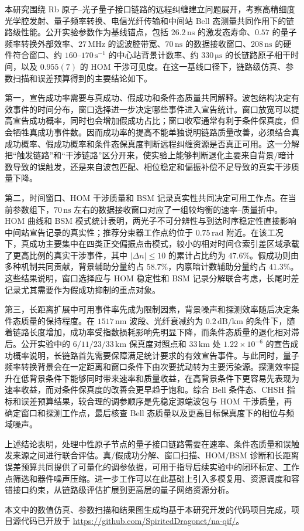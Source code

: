 
\begin{conclusions}

本研究围绕 Rb 原子--光子量子接口链路的远程纠缠建立问题展开，考察高精细度光学腔发射、量子频率转换、电信光纤传输和中间站 Bell 态测量共同作用下的链路级性能。公开实验参数作为基线锚点，包括 $26.2\,\mathrm{ns}$ 的激发态寿命、$0.57$ 的量子频率转换外部效率、$27\,\mathrm{MHz}$ 的滤波腔带宽、$70\,\mathrm{ns}$ 的数据接收窗口、$208\,\mathrm{ns}$ 的硬件符合窗口、约 $160$--$170\,\mathrm{s^{-1}}$ 的中心站背景计数率、约 $330\,\mathrm{\mu s}$ 的长链路原子相干时间，以及 $0.955(7)$ 的 HOM 干涉可见度。在这一基线口径下，链路级仿真、参数扫描和误差预算得到的主要结论如下。

第一，宣告成功率需要与真成功、假成功和条件态质量共同解释。波包结构决定有效事件的时间分布，窗口选择进一步决定哪些事件进入宣告统计。窗口放宽可以提高宣告成功概率，同时也会增加假成功占比；窗口收窄通常有利于条件保真度，但会牺牲真成功事件数。因而成功率的提高不能单独说明链路质量改善，必须结合真成功概率、假成功概率和条件态保真度判断远程纠缠资源是否真正可用。这一分解把“触发链路”和“干涉链路”区分开来，使实验上能够判断退化主要来自背景/暗计数导致的误触发，还是来自波包匹配、相位稳定和偏振补偿不足导致的真实干涉质量下降。

第二，时间窗口、HOM 干涉质量和 BSM 记录真实性共同决定可用工作点。在当前参数组下，$70\,\mathrm{ns}$ 左右的数据接收窗口对应了一组较均衡的速率--质量折中。HOM 曲线和 BSM 模式统计表明，两光子不可分辨性与到达时序稳定性直接影响中间站宣告记录的真实性；推荐分束器工作点约位于 $0.75\,\mathrm{rad}$ 附近。在该工况下，真成功主要集中在四类正交偏振点击模式，较小的相对时间仓索引差区域承载了更高比例的真实干涉事件，其中 $|\Delta n|\le 10$ 的累计占比约为 $47.6\%$。假成功则由多种机制共同贡献，背景辅助分量约占 $58.7\%$，内禀暗计数辅助分量约占 $41.3\%$。这些结果说明，窗口选择应与 HOM 稳定性和 BSM 记录分解联合考虑，长尾时差记录尤其需要作为假成功抑制的重点对象。

第三，长距离扩展中可用事件率先成为限制因素，背景噪声和探测效率随后决定条件态质量的保持程度。在 $1517\,\mathrm{nm}$ 波段、光纤衰减约为 $0.2\,\mathrm{dB/km}$ 的条件下，随着链路长度增加，成功率受指数损耗影响先明显下降，而条件态质量的退化相对滞后。公开实验中的 $6/11/23/33\,\mathrm{km}$ 保真度对照点和 $33\,\mathrm{km}$ 处 $1.22\times10^{-6}$ 的宣告成功概率说明，长链路首先需要保障满足统计要求的有效宣告事件。与此同时，量子频率转换背景会在一定距离和窗口条件下由次要扰动转为主要污染源。探测效率提升在低背景条件下能够同时带来速率和质量收益，在高背景条件下更容易先表现为速率收益，而对条件保真度的改善会更早趋于饱和。综合 Bell 条件态、CHSH 指标和误差预算结果，较合理的调参顺序是先稳定源端波包与 HOM 干涉质量，再确定窗口和探测工作点，最后核查 Bell 态质量以及更高目标保真度下的相位与频域噪声。

上述结论表明，处理中性原子节点的量子接口链路需要在速率、条件态质量和误触发来源之间进行联合评估。真/假成功分解、窗口扫描、HOM/BSM 诊断和长距离误差预算共同提供了可量化的调参依据，可用于指导后续实验中的闭环标定、工作点筛选和器件噪声压缩。进一步工作可以在此基础上引入多模复用、资源调度和容错接口约束，从链路级评估扩展到更高层的量子网络资源分析。

本文中的数值仿真、参数扫描和结果图生成均基于本研究开发的代码项目完成，项目源代码已开放于 \url{https://github.com/SpiritedDragonet/na-qif/}。

\end{conclusions}
